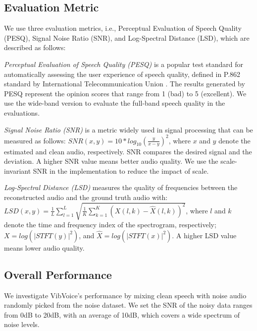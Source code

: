 \subsection{Evaluation Metric}\label{metric}
We use three evaluation metrics, i.e., Perceptual Evaluation of Speech Quality (PESQ), Signal Noise Ratio (SNR), and Log-Spectral Distance (LSD), which are described as follows:

\noindent\textit{Perceptual Evaluation of Speech Quality (PESQ)}
is a popular test standard for automatically assessing the user experience of speech quality, defined in P.862 standard by International Telecommunication Union \citep{rix2001perceptual}. The results generated by PESQ represent the opinion scores that range from 1 (bad) to 5 (excellent). We use the wide-band version to evaluate the full-band speech quality in the evaluations.

\noindent\textit{Signal Noise Ratio (SNR)}
is a metric widely used in signal processing that can be measured as follows:
$SNR(x, y) = 10*log_{10}(\frac{y}{x-y})^2$, where $x$ and $y$ denote the estimated and clean audio, respectively.
SNR compares the desired signal and the deviation. A higher SNR value means better audio quality. We use the scale-invariant SNR in the implementation to reduce the impact of scale.

\noindent\textit{Log-Spectral Distance (LSD)}
measures the quality of frequencies between the reconstructed audio and the ground truth audio with: 
$LSD(x, y)= \frac{1}{L} \sum_{l=1}^{L} \sqrt{\frac{1}{K}\sum_{k=1}^{K}(X(l,k) - \hat{X}(l,k))^2}$,
where $l$ and $k$ denote the time and frequency index of the spectrogram, respectively; $X = log(|STFT(y)|^2)$, and $\hat{X} = log(|STFT(x)|^2)$. A higher LSD value means lower audio quality.

\subsection{Overall Performance}
\label{sec:vibvoice_overall_eval}
We investigate VibVoice's performance by mixing clean speech with noise audio randomly picked from the noise dataset. We set the SNR of the noisy data ranges from 0dB to 20dB, with an average of 10dB, which covers a wide spectrum of noise levels.

